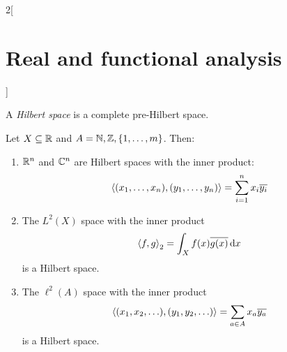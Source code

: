 \documentclass[../../../main_math.tex]{subfiles}
\begin{document}
\begin{multicols}{2}[\section{Real and functional analysis}]
\begin{definition}
    A \emph{Hilbert space} is a complete pre-Hilbert space.
  \end{definition}
  \begin{proposition}
    Let $X\subseteq \mathbb{R}$ and $A=\mathbb{N},\mathbb{Z},\{1,\ldots,m\}$. Then:
    \begin{enumerate}
      \item $\mathbb{R}^n$ and $\mathbb{C}^n$ are Hilbert spaces with the inner product: $${\left\langle(x_1,\ldots,x_n),(y_1,\ldots,y_n)\right\rangle}=\sum_{i= 1}^nx_i\overline{y_i}$$
      \item The $L^2(X)$ space with the inner product $${\left\langle f,g\right\rangle}_2=\int_Xf(x)\overline{g(x)}\dd{x}$$ is a Hilbert space.
      \item The $\ell^2(A)$ space with the inner product $${\left\langle(x_1,x_2,\ldots),(y_1,y_2,\ldots)\right\rangle}=\sum_{a\in A}x_a\overline{y_a}$$ is a Hilbert space.
    \end{enumerate}
  \end{proposition}

\end{multicols}
\end{document}
